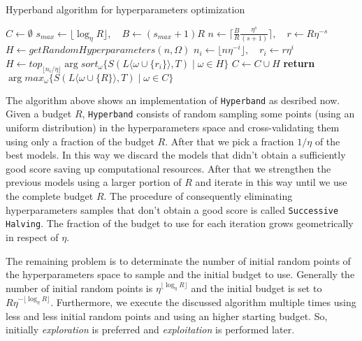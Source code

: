 \documentclass[11pt, a4paper]{article}
\begin{document}
  \begin{algorithm}
    \caption{Hyperband algorithm for hyperparameters optimization}
    \label{algorithm:hyperband}
    \begin{algorithmic}[1]
        \State $C \gets \emptyset$
        \State $s_{max} \gets \lfloor \log_{\eta}{R} \rfloor, \quad B \gets (s_{max} + 1)R$
          \State $n \gets \lceil \frac{B}{R}\frac{\eta^{s}}{(s+1)} \rceil, \quad r \gets R\eta^{-s}$
          \State $H \gets getRandomHyperparameters(n,\Omega)$
            \State $n_{i} \gets \lfloor n\eta^{-i} \rfloor, \quad r_{i} \gets r\eta^{i}$
            \State $H \gets top_{\lfloor n_{i}/\eta \rfloor} \arg sort_{\omega} \{S(L\langle\omega \cup \{r_{i}\}\rangle, T) \mid \omega \in H\}$
          \EndFor
          \State $C \gets C \cup H$
        \EndFor
        \State \textbf{return} $\arg max_{\omega} \{S(L\langle\omega \cup \{R\}\rangle, T) \mid \omega \in C\}$
      \EndProcedure
    \end{algorithmic}
  \end{algorithm}

  The algorithm above shows an implementation of \texttt{Hyperband} as desribed now. Given a budget $R$, \texttt{Hyperband} consists of random sampling some points (using an uniform distribution) in the hyperparameters space and cross-validating them using only a fraction of the budget $R$. After that we pick a fraction $1/\eta$ of the best models. In this way we discard the models that didn't obtain a sufficiently good score saving up computational resources. After that we strengthen the previous models using a larger portion of $R$ and iterate in this way until we use the complete budget $R$. The procedure of consequently eliminating hyperparameters samples that don't obtain a good score is called \texttt{Successive Halving}. The fraction of the budget to use for each iteration grows geometrically in respect of $\eta$.

  The remaining problem is to determinate the number of initial random points of the hyperparameters space to sample and the initial budget to use. Generally the number of initial random points is $\eta^{\lfloor \log_{\eta}R \rfloor}$ and the initial budget is set to $R\eta^{-\lfloor \log_{\eta}R \rfloor}$. Furthermore, we execute the discussed algorithm multiple times using less and less initial random points and using an higher starting budget. So, initially \textit{exploration} is preferred and \textit{exploitation} is performed later.
\end{document}
